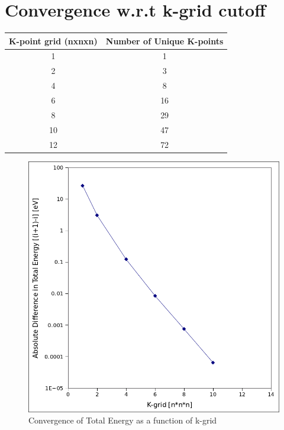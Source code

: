 \documentclass{article}
\begin{document}
\section*{Convergence w.r.t k-grid cutoff}

\begin{center}
\begin{tabular}{|c|c|}
  \hline
  K-point grid (nxnxn) & Number of Unique K-points \\ \hline
 1  &   1   \\ \hline
 2  &   3	\\ \hline
 4  &   8 	\\ \hline
 6  &   16	\\ \hline
 8  &   29	\\ \hline
 10  &   47	\\ \hline
 12  &   72	\\ \hline
\end{tabular}
\end{center}
\begin{figure}[h!]
\centering
\includegraphics[totalheight=0.5\textheight]{kgrid.png}
\caption{Convergence of Total Energy as a function of k-grid}
\label{fig:aNicePicture}
\end{figure}
\newpage
\end{document}
